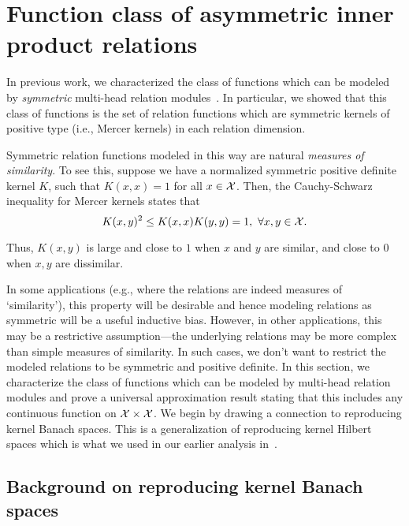 \section{Function class of asymmetric inner product relations}\label{sec:asymmetric_relations}

In previous work, we characterized the class of functions which can be modeled by \textit{symmetric} multi-head relation modules~\parencite{altabaaAbstractorsTransformer2023}. In particular, we showed that this class of functions is the set of relation functions which are symmetric kernels of positive type (i.e., Mercer kernels) in each relation dimension.

Symmetric relation functions modeled in this way are natural \textit{measures of similarity}. To see this, suppose we have a normalized symmetric positive definite kernel $K$, such that $K(x,x) = 1$ for all $x \in {\mathcal{X}}$. Then, the Cauchy-Schwarz inequality for Mercer kernels states that
\begin{equation}
    K(x, y)^2 \leq K(x, x) K(y, y) = 1, \ \forall x, y \in {\mathcal{X}}.
\end{equation}

Thus, $K(x,y)$ is large and close to $1$ when $x$ and $y$ are similar, and close to $0$ when $x, y$ are dissimilar. 

In some applications (e.g., where the relations are indeed measures of `similarity'), this property will be desirable and hence modeling relations as symmetric will be a useful inductive bias. However, in other applications, this may be a restrictive assumption---the underlying relations may be more complex than simple measures of similarity. In such cases, we don't want to restrict the modeled relations to be symmetric and positive definite. In this section, we characterize the class of functions which can be modeled by multi-head relation modules and prove a universal approximation result stating that this includes any continuous function on ${\mathcal{X}} \times {\mathcal{X}}$. We begin by drawing a connection to reproducing kernel Banach spaces. This is a generalization of reproducing kernel Hilbert spaces which is what we used in our earlier analysis in~\parencite{altabaaAbstractorsTransformer2023}.


\subsection{Background on reproducing kernel Banach spaces}

